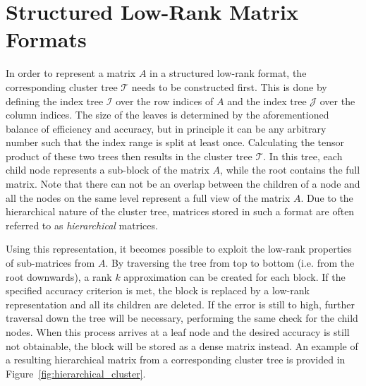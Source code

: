 \section{Structured Low-Rank Matrix Formats}
\label{sec:matrix_formats}

In order to represent a matrix $A$ in a structured low-rank format, the corresponding cluster tree $\mathcal{T}$ needs to be constructed first. This is done by defining the index tree $\mathcal{I}$ over the row indices of $A$ and the index tree $\mathcal{J}$ over the column indices. The size of the leaves is determined by the aforementioned balance of  efficiency and accuracy, but in principle it can be any arbitrary number such that the index range is split at least once. Calculating the tensor product of these two trees then results in the cluster tree $\mathcal{T}$. In this tree, each child node represents a sub-block of the matrix $A$, while the root contains the full matrix. Note that there can not be an overlap between the children of a node and all the nodes on the same level represent a full view of the matrix $A$. Due to the hierarchical nature of the cluster tree, matrices stored in such a format are often referred to as \textit{hierarchical} matrices.

Using this representation, it becomes possible to exploit the low-rank properties of sub-matrices from $A$. By traversing the tree from top to bottom (i.e. from the root downwards), a rank $k$ approximation can be created for each block. If the specified accuracy criterion is met, the block is replaced by a low-rank representation and all its children are deleted. If the error is still to high, further traversal down the tree will be necessary, performing the same check for the child nodes. When this process arrives at a leaf node and the desired accuracy is still not obtainable, the block will be stored as a dense matrix instead. An example of a resulting hierarchical matrix from a corresponding cluster tree is provided in Figure~\hyperref[fig:hierarchical_cluster]{\ref{fig:hierarchical_cluster}}.

